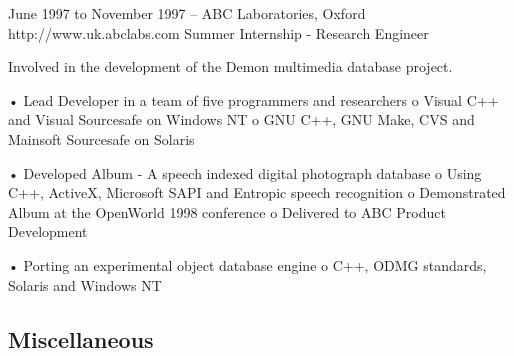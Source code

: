 June 1997 to November 1997 – ABC  Laboratories, Oxford
http://www.uk.abclabs.com
Summer Internship - Research Engineer

Involved in the development of the Demon multimedia database project.

•	Lead Developer in a team of five programmers and researchers
  o	Visual C++ and Visual Sourcesafe on Windows NT
  o	GNU C++, GNU Make, CVS and Mainsoft Sourcesafe on Solaris
  
•	Developed Album - A speech indexed digital photograph database
  o	Using C++, ActiveX, Microsoft SAPI and Entropic speech recognition
  o	Demonstrated Album at the OpenWorld 1998 conference
  o	Delivered to ABC Product Development
  
•	Porting an experimental object database engine 
  o	C++, ODMG standards, Solaris and Windows NT



\subsection{Miscellaneous}
\fi